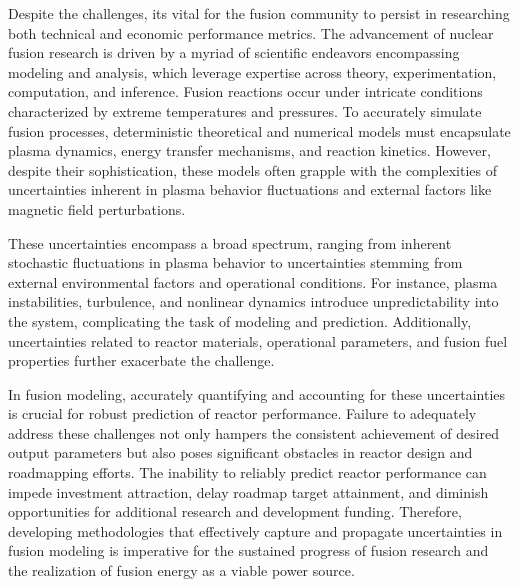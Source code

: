 \documentclass[journal]{IEEEtran}
\begin{document}
Despite the challenges, its vital for the fusion community to persist in researching both technical and economic performance metrics. The advancement of nuclear fusion research is driven by a myriad of scientific endeavors encompassing modeling and analysis, which leverage expertise across theory, experimentation, computation, and inference. Fusion reactions occur under intricate conditions characterized by extreme temperatures and pressures. To accurately simulate fusion processes, deterministic theoretical and numerical models must encapsulate plasma dynamics, energy transfer mechanisms, and reaction kinetics. However, despite their sophistication, these models often grapple with the complexities of uncertainties inherent in plasma behavior fluctuations and external factors like magnetic field perturbations. 

These uncertainties encompass a broad spectrum, ranging from inherent stochastic fluctuations in plasma behavior to uncertainties stemming from external environmental factors and operational conditions. For instance, plasma instabilities, turbulence, and nonlinear dynamics introduce unpredictability into the system, complicating the task of modeling and prediction. Additionally, uncertainties related to reactor materials, operational parameters, and fusion fuel properties further exacerbate the challenge.

In fusion modeling, accurately quantifying and accounting for these uncertainties is crucial for robust prediction of reactor performance. Failure to adequately address these challenges not only hampers the consistent achievement of desired output parameters but also poses significant obstacles in reactor design and roadmapping efforts. The inability to reliably predict reactor performance can impede investment attraction, delay roadmap target attainment, and diminish opportunities for additional research and development funding. Therefore, developing methodologies that effectively capture and propagate uncertainties in fusion modeling is imperative for the sustained progress of fusion research and the realization of fusion energy as a viable power source.
\end{document}
